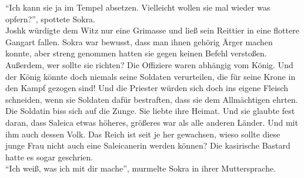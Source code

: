 ``Ich kann sie ja im Tempel absetzen. Vielleicht wollen sie mal wieder was opfern?'', spottete 
Sokra.\\
Joshk würdigte dem Witz nur eine Grimasse und ließ sein Reittier in eine flottere Gangart fallen.
Sokra war bewusst, dass man ihnen gehörig Ärger machen konnte, aber streng genommen hatten sie gegen 
keinen Befehl verstoßen. Außerdem, wer sollte sie richten? Die Offiziere waren abhängig vom König. 
Und der König könnte doch niemals seine Soldaten verurteilen, die für seine Krone in 
den Kampf gezogen sind! Und die Priester würden sich doch ins eigene Fleisch schneiden, wenn sie 
Soldaten dafür bestraften, dass sie dem Allmächtigen ehrten.\\
Die Soldatin biss sich auf die Zunge. Sie liebte ihre Heimat. Und sie glaubte fest daran, dass 
Saleica etwas höheres, größeres war als alle anderen Länder. Und mit ihm auch dessen Volk. 
Das Reich ist seit je her gewachsen, wieso sollte diese junge Frau nicht auch eine Saleicanerin 
werden können? Die kasirische Bastard hatte es sogar geschrien.\\
``Ich weiß, was ich mit dir mache'', murmelte Sokra in ihrer Muttersprache.\\
